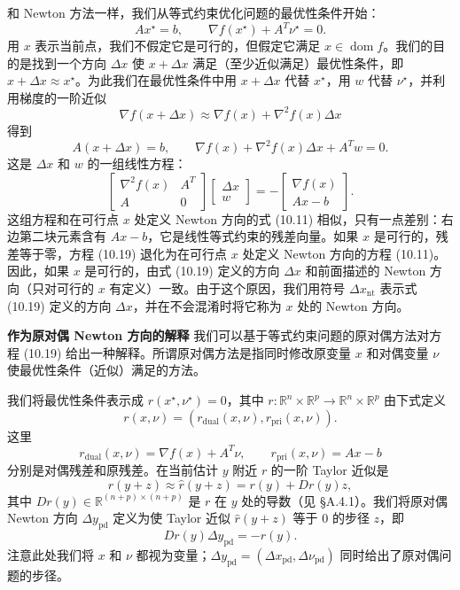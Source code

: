 \documentclass[UTF8, 12pt, fontset=fandol, oneside]{ctexart}
\begin{document}
和 Newton 方法一样，我们从等式约束优化问题的最优性条件开始：
\[
Ax^\star=b,\qquad \nabla f(x^\star)+A^T\nu^\star=0.
\]
用 $x$ 表示当前点，我们不假定它是可行的，但假定它满足 $x\in\operatorname{dom} f$。我们的目的是找到一个方向 $\Delta x$ 使 $x+\Delta x$ 满足（至少近似满足）最优性条件，即 $x+\Delta x\approx x^\star$。为此我们在最优性条件中用 $x+\Delta x$ 代替 $x^\star$，用 $w$ 代替 $\nu^\star$，并利用梯度的一阶近似
\[
\nabla f(x+\Delta x)\approx \nabla f(x)+\nabla^2 f(x)\Delta x
\]
得到
\[
A(x+\Delta x)=b,\qquad
\nabla f(x)+\nabla^2 f(x)\Delta x+A^Tw=0.
\]
这是 $\Delta x$ 和 $w$ 的一组线性方程：
\begin{equation}
\begin{bmatrix}
\nabla^2 f(x) & A^T\\
A & 0
\end{bmatrix}
\begin{bmatrix}
\Delta x\\
w
\end{bmatrix}
=-
\begin{bmatrix}
\nabla f(x)\\
Ax-b
\end{bmatrix}.
\tag{10.19}
\end{equation}
这组方程和在可行点 $x$ 处定义 Newton 方向的式 (10.11) 相似，只有一点差别：右边第二块元素含有 $Ax-b$，它是线性等式约束的残差向量。如果 $x$ 是可行的，残差等于零，方程 (10.19) 退化为在可行点 $x$ 处定义 Newton 方向的方程 (10.11)。因此，如果 $x$ 是可行的，由式 (10.19) 定义的方向 $\Delta x$ 和前面描述的 Newton 方向（只对可行的 $x$ 有定义）一致。由于这个原因，我们用符号 $\Delta x_{\mathrm{nt}}$ 表示式 (10.19) 定义的方向 $\Delta x$，并在不会混淆时将它称为 $x$ 处的 Newton 方向。

\noindent\textbf{作为原对偶 Newton 方向的解释}\quad
我们可以基于等式约束问题的原对偶方法对方程 (10.19) 给出一种解释。所谓原对偶方法是指同时修改原变量 $x$ 和对偶变量 $\nu$ 使最优性条件（近似）满足的方法。

我们将最优性条件表示成 $r(x^\star,\nu^\star)=0$，其中 $r:\mathbb{R}^n\times\mathbb{R}^p\to\mathbb{R}^n\times\mathbb{R}^p$ 由下式定义
\[
r(x,\nu)=(r_{\mathrm{dual}}(x,\nu),r_{\mathrm{pri}}(x,\nu)).
\]
这里
\[
r_{\mathrm{dual}}(x,\nu)=\nabla f(x)+A^T\nu,\qquad
r_{\mathrm{pri}}(x,\nu)=Ax-b
\]
分别是对偶残差和原残差。在当前估计 $y$ 附近 $r$ 的一阶 Taylor 近似是
\[
r(y+z)\approx \hat{r}(y+z)=r(y)+Dr(y)z,
\]
其中 $Dr(y)\in\mathbb{R}^{(n+p)\times(n+p)}$ 是 $r$ 在 $y$ 处的导数（见 \S A.4.1）。我们将原对偶 Newton 方向 $\Delta y_{\mathrm{pd}}$ 定义为使 Taylor 近似 $\hat{r}(y+z)$ 等于 $0$ 的步径 $z$，即
\begin{equation}
Dr(y)\Delta y_{\mathrm{pd}}=-r(y).
\tag{10.20}
\end{equation}
注意此处我们将 $x$ 和 $\nu$ 都视为变量；$\Delta y_{\mathrm{pd}}=(\Delta x_{\mathrm{pd}},\Delta\nu_{\mathrm{pd}})$ 同时给出了原对偶问题的步径。
\end{document}
